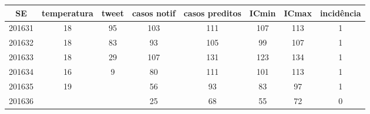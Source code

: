 \begin{tabular}{c|ccccccc}
  \hline
SE & temperatura & tweet & casos notif & casos preditos & ICmin & ICmax & incidência \\ 
  \hline
201631 & 18 & 95 & 103 & 111 & 107 & 113 & 1 \\ 
  201632 & 18 & 83 & 93 & 105 & 99 & 107 & 1 \\ 
  201633 & 18 & 29 & 107 & 131 & 123 & 134 & 1 \\ 
  201634 & 16 & 9 & 80 & 111 & 101 & 113 & 1 \\ 
  201635 & 19 &  & 56 & 93 & 83 & 97 & 1 \\ 
  201636 &  &  & 25 & 68 & 55 & 72 & 0 \\ 
   \hline
\end{tabular}
